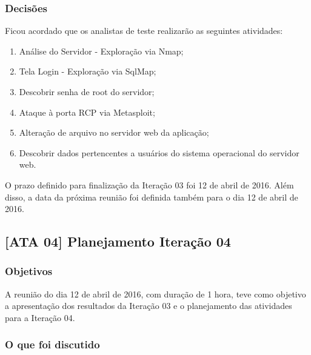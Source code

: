 \documentclass[
    12pt,               %
    openright,          %
    oneside,            %
    a4paper,            %
    section=TITLE,     %
    english,            %
    french,             %
    spanish,            %
    brazil              %
    ]{abntex2}
\begin{document}
\subsubsection*{Decisões}

Ficou acordado que os analistas de teste realizarão as seguintes atividades:



\begin{enumerate}[start=1]
	
\item Análise do Servidor - Exploração via Nmap;
	
\item Tela Login - Exploração via SqlMap;
	
\item Descobrir senha de root do servidor;
	
\item Ataque à porta RCP via Metasploit;
	
\item Alteração de arquivo no servidor web da aplicação;
	
\item Descobrir dados pertencentes a usuários do sistema operacional do servidor web.

\end{enumerate}

O prazo definido para finalização da Iteração 03 foi 12 de abril de 2016. Além disso, a data da próxima reunião foi definida também para o dia 12 de abril de 2016.



\subsection*{{[}ATA 04{]} Planejamento Iteração 04}


\subsubsection*{Objetivos}

A reunião do dia 12 de abril de 2016, com duração de 1 hora, teve como objetivo a apresentação dos resultados da Iteração 03 e o planejamento das atividades para a Iteração 04.



\subsubsection*{O que foi discutido}
\end{document}
